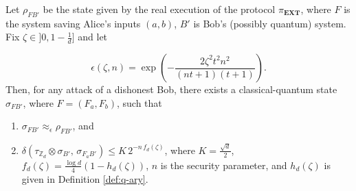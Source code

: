\begin{lemma}
Let $\rho_{F B'}$ be the state given by the real execution of the protocol $\pi_{\textbf{EXT}}$, where $F$ is the system saving Alice's inputs $(a,b)$, $B'$ is Bob's (possibly quantum) system. Fix $\zeta \in ]0, 1-\frac{1}{d}]$ and let 

$$\epsilon(\zeta, n) = \exp( -\frac{2 \zeta^2t^2n^2}{(nt+1)(t+1)}).$$
Then, for any attack of a dishonest Bob, there exists a classical-quantum state  $\sigma_{F B'}$, where   $F = (F_{a}, F_{b})$, such that 

\begin{enumerate}
    \item $ \sigma_{F B'} \approx_{\epsilon} \rho_{F B'}$, and
    \item  $\delta( \tau_{\mathbb{Z}_d} \otimes \sigma_{B'},\, \sigma_{F_{a} B'} ) \leq K\, 2^{-n \, f_d(\zeta)}$, where $K = \frac{\sqrt{d}}{2}$, $f_d(\zeta) = \frac{\log d}{4} (1-h_d(\zeta))$, $n$ is the security parameter, and $h_d(\zeta)$  is given in Definition \ref{def:q-ary}.
\end{enumerate}

\label{lemma:extraction}
\end{lemma}
